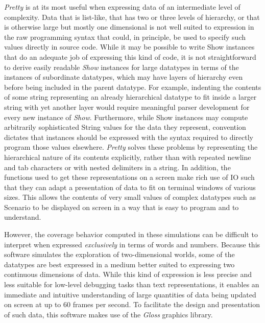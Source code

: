 \textit{Pretty} is at its most useful when expressing data of an intermediate level of complexity. Data that is list-like, that has two or three levels of hierarchy, or that is otherwise large but mostly one dimensional is not well suited to expression in the raw programming syntax that could, in principle, be used to specify such values directly in source code. While it may be possible to write Show instances that do an adequate job of expressing this kind of code, it is not straightforward to derive easily readable \textit{Show} instances for large datatypes in terms of the instances of subordinate datatypes, which may have layers of hierarchy even before being included in the parent datatype. For example, indenting the contents of some string representing an already hierarchical datatype to fit inside a larger string with yet another layer would require meaningful parser development for every new instance of \textit{Show}. Furthermore, while Show instances may compute arbitrarily sophisticated String values for the data they represent, convention dictates that instances should be expressed with the syntax required to directly program those values elsewhere. \textit{Pretty} solves these problems by representing the hierarchical nature of its contents explicitly, rather than with repeated newline and tab characters or with nested delimiters in a string. In addition, the functions used to get these representations on a screen make rich use of IO such that they can adapt a presentation of data to fit on terminal windows of various sizes. This allows the contents of very small values of complex datatypes such as Scenario to be displayed on screen in a way that is easy to program and to understand.

However, the coverage behavior computed in these simulations can be difficult to interpret when expressed \textit{exclusively} in terms of words and numbers. Because this software simulates the exploration of two-dimensional worlds, some of the datatypes are best expressed in a medium better suited to expressing two continuous dimensions of data. While this kind of expression is less precise and less suitable for low-level debugging tasks than text representations, it enables an immediate and intuitive understanding of large quantities of data being updated on screen at up to 60 frames per second. To facilitate the design and presentation of such data, this software makes use of the \textit{Gloss} graphics library.

